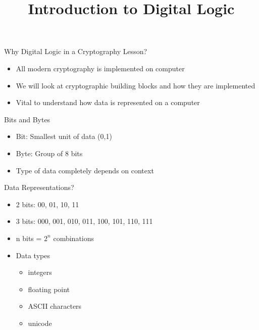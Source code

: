 

\title[]{Introduction to Digital Logic}

\begin{frame}
\titlepage
\end{frame}

\begin{withoutheadline}

\begin{frame}{Why Digital Logic in a Cryptography Lesson?}
\begin{itemize}
    \item All modern cryptography is implemented on computer
    \item We will look at cryptographic building blocks and how they are implemented
    \item Vital to understand how data is represented on a computer
\end{itemize}
\end{frame}
    
\begin{frame}{Bits and Bytes}
\begin{itemize}
    \item Bit: Smallest unit of data (0,1)
    \item Byte: Group of 8 bits
    \item Type of data completely depends on context
\end{itemize}
\end{frame}

\begin{frame}{Data Representations?}
\begin{itemize}
    \item 2 bits: 00, 01, 10, 11
    \item 3 bits: 000, 001, 010, 011, 100, 101, 110, 111
    \item n bits = $2^n$ combinations
    \item Data types
   \begin{itemize}
       \item integers
       \item floating point
       \item ASCII characters
       \item unicode
   \end{itemize}
\end{itemize}
\end{frame}


\end{withoutheadline}
